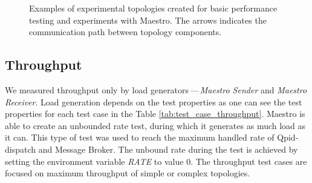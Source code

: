\begin{figure}[h]
\begin{minipage}{0.45\linewidth}
	\end{minipage}
	\begin{minipage}{0.45\linewidth}
	\end{minipage}
	\caption[Examples of experimental topologies created for basic performance testing and experiments with Maestro.]{Examples of experimental topologies created for basic performance testing and experiments with Maestro. The arrows indicates the communication path between topology components.}\label{fig:basic_topologies}
\end{figure}

\subsection{Throughput}
\label{Throughput}
We measured throughput only by load generators\,---\,\emph{Maes\-tro Sender} and \emph{Maestro Receiver}. Load generation depends on the test properties as one can see the test properties for each test case in the Table \ref{tab:test_case_throughput}. Maestro is able to create an unbounded rate test, during which it generates as much load as it can. This type of test was used to reach the maximum handled rate of Qpid-dispatch and Message Broker. The unbound rate during the test is achieved by setting the environment variable \emph{RATE} to value 0. The throughput test cases are focused on maximum throughput of simple or complex topologies.

